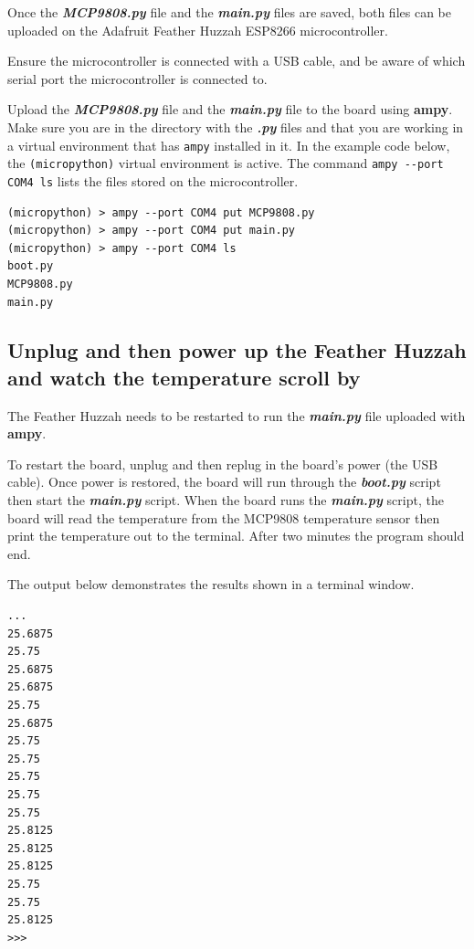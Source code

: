 \documentclass{book}
\begin{document}
    
        Once the \textbf{\emph{MCP9808.py}} file and the \textbf{\emph{main.py}}
files are saved, both files can be uploaded on the Adafruit Feather
Huzzah ESP8266 microcontroller.

Ensure the microcontroller is connected with a USB cable, and be aware
of which serial port the microcontroller is connected to.

Upload the \textbf{\emph{MCP9808.py}} file and the
\textbf{\emph{main.py}} file to the board using \textbf{ampy}. Make sure
you are in the directory with the \textbf{\emph{.py}} files and that you
are working in a virtual environment that has \lstinline!ampy! installed
in it. In the example code below, the \lstinline!(micropython)! virtual
environment is active. The command \lstinline!ampy --port COM4 ls! lists
the files stored on the microcontroller.

\begin{lstlisting}
(micropython) > ampy --port COM4 put MCP9808.py
(micropython) > ampy --port COM4 put main.py
(micropython) > ampy --port COM4 ls
boot.py
MCP9808.py
main.py
\end{lstlisting}
    




    
        \subsection{Unplug and then power up the Feather Huzzah and watch the
temperature scroll
by}\label{unplug-and-then-power-up-the-feather-huzzah-and-watch-the-temperature-scroll-by}
    




    
        The Feather Huzzah needs to be restarted to run the
\textbf{\emph{main.py}} file uploaded with \textbf{ampy}.

To restart the board, unplug and then replug in the board's power (the
USB cable). Once power is restored, the board will run through the
\textbf{\emph{boot.py}} script then start the \textbf{\emph{main.py}}
script. When the board runs the \textbf{\emph{main.py}} script, the
board will read the temperature from the MCP9808 temperature sensor then
print the temperature out to the terminal. After two minutes the program
should end.

The output below demonstrates the results shown in a terminal window.

\begin{lstlisting}
...
25.6875
25.75
25.6875
25.6875
25.75
25.6875
25.75
25.75
25.75
25.75
25.75
25.8125
25.8125
25.8125
25.75
25.75
25.8125
>>>
\end{lstlisting}
    
\end{document}
